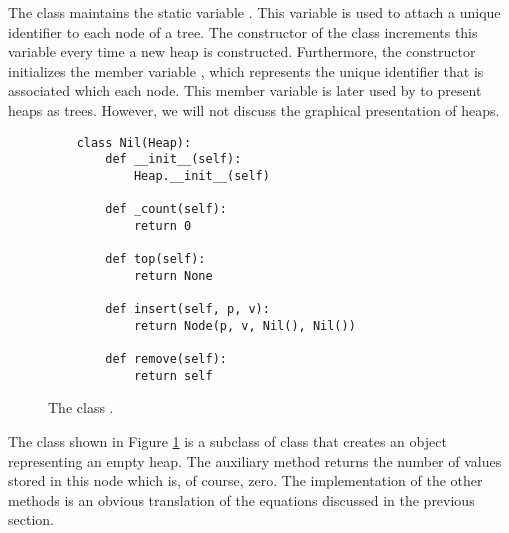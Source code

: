 The class  maintains the static variable .  This variable is used to attach a
unique identifier to each node of a tree.  The constructor of the class  increments this variable
every time a new heap is constructed.  Furthermore, the constructor initializes the member variable
, which represents the unique identifier that is associated which each node.  This member variable
is later used by  to present heaps as trees.  However, we will not discuss the graphical
presentation of heaps.

\begin{figure}[!ht]
\centering
\begin{verbatim}
    class Nil(Heap):
        def __init__(self):
            Heap.__init__(self)
    
        def _count(self):
            return 0

        def top(self):
            return None

        def insert(self, p, v):
            return Node(p, v, Nil(), Nil())   

        def remove(self):
            return self
\end{verbatim}
\vspace*{-0.3cm}
\caption{The class .}
\label{fig:Heap.ipynb:Nil}
\end{figure}

The class  shown in Figure \ref{fig:Heap.ipynb:Nil} is a subclass of class 
that creates an object representing an empty heap.
The auxiliary method  returns the number of values stored in this node which is, of course,
zero.  The implementation of the other methods is an obvious translation of the equations discussed in the
previous section.

